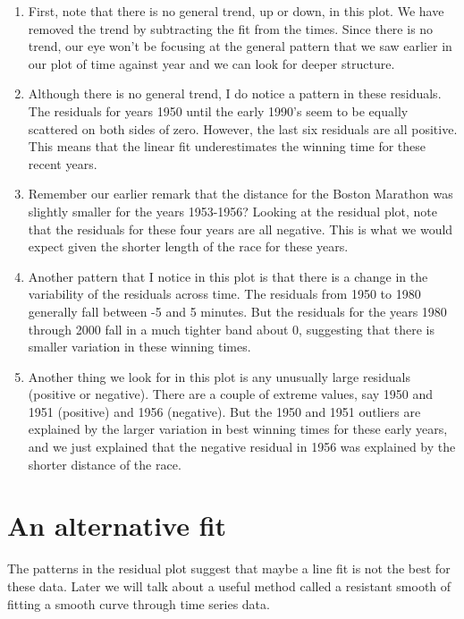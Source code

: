 \documentclass[
]{book}
\begin{document}
\begin{enumerate}
\def\labelenumi{\arabic{enumi}.}
\item
  First, note that there is no general trend, up or down, in this plot. We have removed the trend by subtracting the fit from the times. Since there is no trend, our eye won't be focusing at the general pattern that we saw earlier in our plot of time against year and we can look for deeper structure.
\item
  Although there is no general trend, I do notice a pattern in these residuals. The residuals for years 1950 until the early 1990's seem to be equally scattered on both sides of zero. However, the last six residuals are all positive. This means that the linear fit underestimates the winning time for these recent years.
\item
  Remember our earlier remark that the distance for the Boston Marathon was slightly smaller for the years 1953-1956? Looking at the residual plot, note that the residuals for these four years are all negative. This is what we would expect given the shorter length of the race for these years.
\item
  Another pattern that I notice in this plot is that there is a change in the variability of the residuals across time. The residuals from 1950 to 1980 generally fall between -5 and 5 minutes. But the residuals for the years 1980 through 2000 fall in a much tighter band about 0, suggesting that there is smaller variation in these winning times.
\item
  Another thing we look for in this plot is any unusually large residuals (positive or negative). There are a couple of extreme values, say 1950 and 1951 (positive) and 1956 (negative). But the 1950 and 1951 outliers are explained by the larger variation in best winning times for these early years, and we just explained that the negative residual in 1956 was explained by the shorter distance of the race.
\end{enumerate}

\hypertarget{an-alternative-fit}{%
\section{An alternative fit}\label{an-alternative-fit}}

The patterns in the residual plot suggest that maybe a line fit is not the best for these data. Later we will talk about a useful method called a resistant smooth of fitting a smooth curve through time series data.
\end{document}
